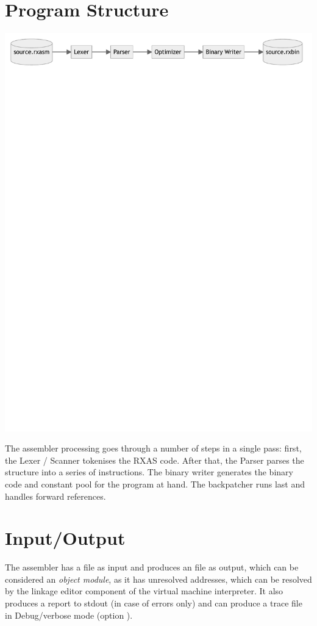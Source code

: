 \section{Program Structure}
\includegraphics[width=\textwidth]{charts/asmstructure.pdf}

The assembler processing goes through a number of steps in a single
pass: first, the Lexer / Scanner tokenises the RXAS code. After that,
the Parser parses the structure into a series of instructions. The
binary writer generates the binary code and constant pool for the
program at hand. The backpatcher runs last and handles forward references.

\section{Input/Output}

The  assembler has a  file as input and
produces an  file as output, which can be considered an
\emph{object module}, as it has unresolved addresses, which can be
resolved by the linkage editor component of the  virtual
machine interpreter. It also produces a report to stdout (in case of
errors only) and can produce a trace file in Debug/verbose mode
(option ).

